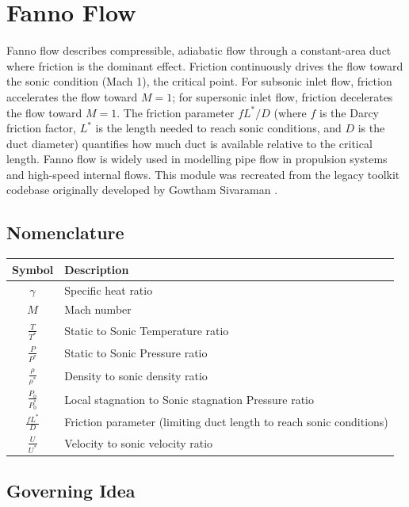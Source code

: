 \chapter{Fanno Flow}

Fanno flow describes compressible, adiabatic flow through a constant-area duct where friction is the dominant effect. Friction continuously drives the flow toward the sonic condition (Mach 1), the critical point. For subsonic inlet flow, friction accelerates the flow toward $M = 1$; for supersonic inlet flow, friction decelerates the flow toward $M = 1$. The friction parameter $fL^*/D$ (where $f$ is the Darcy friction factor, $L^*$ is the length needed to reach sonic conditions, and $D$ is the duct diameter) quantifies how much duct is available relative to the critical length. Fanno flow is widely used in modelling pipe flow in propulsion systems and high-speed internal flows. This module was recreated from the legacy toolkit codebase originally developed by Gowtham Sivaraman \cite{sivaraman2015}.

\section{Nomenclature}

\begin{center}
\begin{tabular}{@{}cl@{}}
\toprule
Symbol & Description \\
\midrule
$\gamma$ & Specific heat ratio \\
$M$ & Mach number \\
$\frac{T}{T^*}$ & Static to Sonic Temperature ratio \\
$\frac{P}{P^*}$ & Static to Sonic Pressure ratio \\
$\frac{\rho}{\rho^*}$ & Density to sonic density ratio \\
$\frac{P_0}{P_0^*}$ & Local stagnation to Sonic stagnation Pressure ratio \\
$\frac{f L^*}{D}$ & Friction parameter (limiting duct length to reach sonic conditions) \\
$\frac{U}{U^*}$ & Velocity to sonic velocity ratio \\
\bottomrule
\end{tabular}
\end{center}

\section{Governing Idea}

